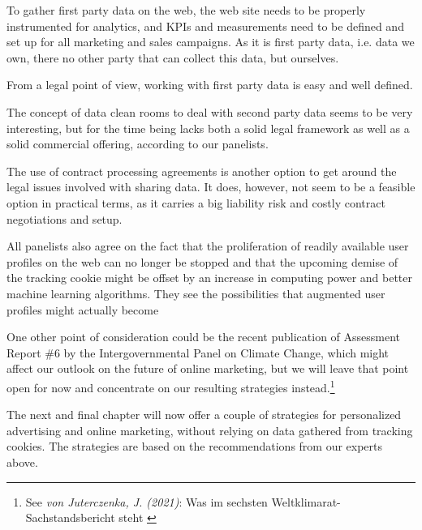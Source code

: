 To gather first party data on the web, the web site needs to be properly instrumented for analytics, and KPIs and measurements need to be defined and set up for all marketing and sales campaigns. As it is first party data, i.e. data we own, there no other party that can collect this data, but ourselves.

From a legal point of view, working with first party data is easy and well defined.

The concept of data clean rooms to deal with second party data seems to be very interesting, but for the time being lacks both a solid legal framework as well as a solid commercial offering, according to our panelists.

The use of contract processing agreements is another option to get around the legal issues involved with sharing data. It does, however, not seem to be a feasible option in practical terms, as it carries a big liability risk and costly contract negotiations and setup.

All panelists also agree on the fact that the proliferation of readily available user profiles on the web can no longer be stopped and that the upcoming demise of the tracking cookie might be offset by an increase in computing power and better machine learning algorithms. They see the possibilities that augmented user profiles might actually become 

One other point of consideration could be the recent publication of Assessment Report \#6 by the Intergovernmental Panel on Climate Change, which might affect our outlook on the future of online marketing, but we will leave that point open for now and concentrate on our resulting strategies instead.\footnote{See \textit{von Juterczenka, J. (2021)}: Was im sechsten Weltklimarat-Sachstandsbericht steht \cite{ipccAr6}}

The next and final chapter will now offer a couple of strategies for personalized advertising and online marketing, without relying on data gathered from tracking cookies. The strategies are based on the recommendations from our experts above.

